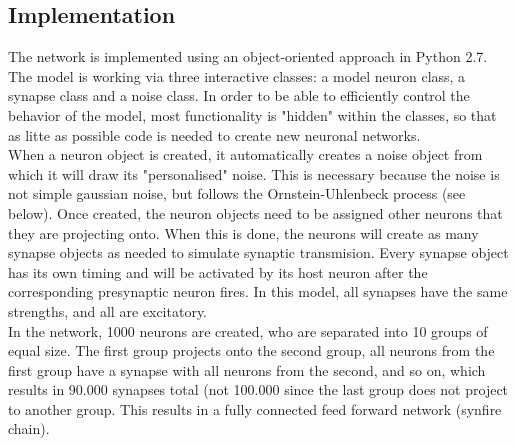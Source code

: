 \documentclass[12pt,a4paper, bibliography=totoc, listof=numbered, footexclude, BCOR=8.25mm, twoside]{scrartcl}
\begin{document}
  \subsection{Implementation}
  The network is implemented using an object-oriented approach in Python 2.7. The model is working via three interactive classes: a model neuron class, a synapse class and a noise class. In order to be able to efficiently control the behavior of the model, most functionality is "hidden" within the classes, so that as litte as possible code is needed to create new neuronal networks.\\
  When a neuron object is created, it automatically creates a noise object from which it will draw its "personalised" noise. This is necessary because the noise is not simple gaussian noise, but follows the Ornstein-Uhlenbeck process (see below). Once created, the neuron objects need to be assigned other neurons that they are projecting onto. When this is done, the neurons will create as many synapse objects as needed to simulate synaptic transmision. Every synapse object has its own timing and will be activated by its host neuron after the corresponding presynaptic neuron fires. In this model, all synapses have the same strengths, and all are excitatory.\\
  In the network, 1000 neurons are created, who are separated into 10 groups of equal size. The first group projects onto the second group, all neurons from the first group have a synapse with all neurons from the second, and so on, which results in 90.000 synapses total (not 100.000 since the last group does not project to another group. This results in a fully connected feed forward network (synfire chain).
  
  

  
\end{document}
